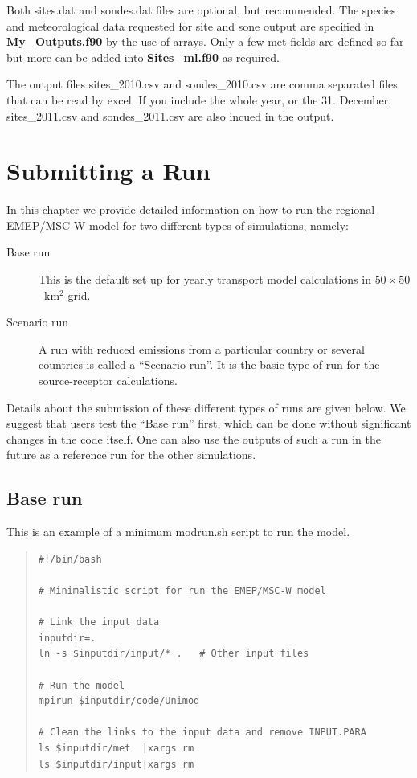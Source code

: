 \documentclass[a4paper,12pt]{report}
\begin{document}
Both sites.dat and sondes.dat files are optional, but recommended. 
The species and meteorological data requested for site and sone output
 are specified in {\bf My\_Outputs.f90} by the use of arrays. Only a 
few met fields are defined so far but more can be added into 
{\bf Sites\_ml.f90} as required. 

The output files sites\_2010.csv and sondes\_2010.csv are comma separated files 
that can be read by excel. If you include the whole year, or the 31. December, sites\_2011.csv 
and sondes\_2011.csv are also incued in the output.
\chapter{Submitting a Run}
\label{ch:SubmitARun}

In this chapter we provide detailed information on how to run the
regional EMEP/MSC-W model for two different types of simulations, namely: 

\begin{description}
\item[Base run]
This is the default set up for yearly transport model calculations
in $50\times50$~km$^2$ grid. 
\item[Scenario run]
 A run with reduced emissions from a particular country or several
 countries is called 
a ``Scenario run''. It is the basic type of run for the source-receptor
calculations. 
\end{description}

\noindent
Details about the submission of these
different types of runs are given below. We suggest that users test
the ``Base run'' first, which can be done without significant changes in
the code itself. One can also use the outputs of such a run in the
future as a reference run for the other simulations.\\  
% 

\newpage
\section{Base run}

This is an example of a minimum modrun.sh script to run the model.

\begin{quote}
\begin{verbatim}
#!/bin/bash

# Minimalistic script for run the EMEP/MSC-W model

# Link the input data
inputdir=.
ln -s $inputdir/input/* .   # Other input files

# Run the model
mpirun $inputdir/code/Unimod

# Clean the links to the input data and remove INPUT.PARA
ls $inputdir/met  |xargs rm
ls $inputdir/input|xargs rm

\end{verbatim}
\end{quote}
\end{document}
